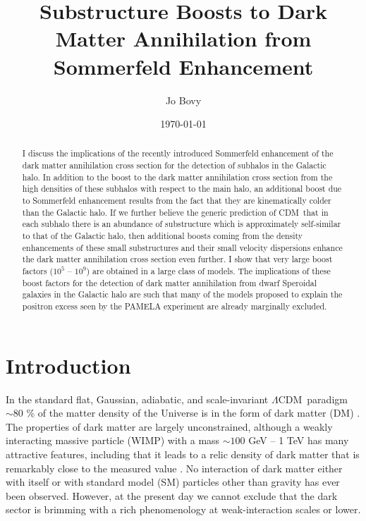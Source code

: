 \documentclass[aps,prd,twocolumn,amsmath,amssymb,floatfix,nofootinbib,10pt]{revtex4}
\newcommand{\CDM}{CDM}
\newcommand{\LCDM}{\ensuremath{\Lambda}\CDM}
\newcommand{\DM}{DM}
\newcommand{\SM}{SM}
\begin{document}
\title{Substructure Boosts to Dark Matter Annihilation from Sommerfeld Enhancement}
\author{Jo Bovy} 

\date{\today}

\begin{abstract}
I discuss the implications of the recently introduced Sommerfeld
enhancement of the dark matter annihilation cross section for the
detection of subhalos in the Galactic halo.  In addition to the boost
to the dark matter annihilation cross section from the high densities
of these subhalos with respect to the main halo, an additional boost
due to Sommerfeld enhancement results from the fact that they are
kinematically colder than the Galactic halo. If we further believe the
generic prediction of \CDM\ that in each subhalo there is an abundance
of substructure which is approximately self-similar to that of the
Galactic halo, then additional boosts coming from the density
enhancements of these small substructures and their small velocity
dispersions enhance the dark matter annihilation cross section even
further. I show that very large boost factors ($10^5$ -- $10^9$) are
obtained in a large class of models. The implications of these boost
factors for the detection of dark matter annihilation from dwarf
Speroidal galaxies in the Galactic halo are such that many of the
models proposed to explain the positron excess seen by the PAMELA
experiment are already marginally excluded.
\end{abstract}

\maketitle

\section{Introduction}
In the standard flat, Gaussian, adiabatic, and scale-invariant \LCDM\
paradigm $\sim\!80$ \% of the matter density of the Universe is in the
form of dark matter (\DM) \cite{2008arXiv0803.0547K}. The properties
of dark matter are largely unconstrained, although a weakly
interacting massive particle (WIMP) with a mass $\sim\!100$ GeV -- 1
TeV has many attractive features, including that it leads to a relic
density of dark matter that is remarkably close to the measured value
\cite{1996PhR...267..195J}. No interaction of dark matter either with
itself or with standard model (\SM) particles other than gravity has
ever been observed. However, at the present day we cannot exclude that
the dark sector is brimming with a rich phenomenology at
weak-interaction scales or lower.
\end{document}
